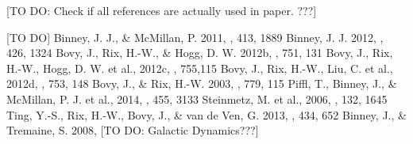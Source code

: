\documentclass[12pt,preprint]{aastex}
\begin{document}
[TO DO: Check if all references are actually used in paper. ???]

\begin{thebibliography}{}
 [TO DO]
 Binney, J. J., \& McMillan, P. 2011, \mnras, 413, 1889
 Binney, J. J. 2012, \mnras, 426, 1324
 Bovy, J., Rix, H.-W., \& Hogg, D. W. 2012b, \apj, 751, 131
 Bovy, J., Rix, H.-W., Hogg, D. W. et al., 2012c, \apj, 755,115
 Bovy, J., Rix, H.-W., Liu, C. et al., 2012d, \apj, 753, 148
  Bovy, J., \& Rix, H.-W. 2003, \apj, 779, 115
 Piffl, T., Binney, J., \& McMillan, P. J. et al., 2014, \mnras, 455, 3133
 Steinmetz, M. et al., 2006, \aj, 132, 1645
 Ting, Y.-S., Rix, H.-W., Bovy, J., \& van de Ven, G. 2013, \mnras, 434, 652
 Binney, J., \& Tremaine, S. 2008, [TO DO: Galactic Dynamics???]
\end{thebibliography}
\end{document}

